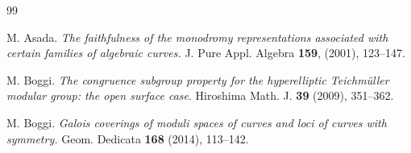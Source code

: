 \documentclass[12pt,twoside]{amsart}
\theoremstyle{definition}
\begin{document}


\begin{thebibliography}{99}





M. Asada. \textsl{The faithfulness of the monodromy representations associated
with certain families of algebraic curves.} J. Pure Appl. Algebra {\bf 159}, (2001), 123--147. 





 M. Boggi. \textsl{The congruence subgroup property for the hyperelliptic 
Teichm\"uller modular group: the open surface case}. Hiroshima Math. J. {\bf 39} (2009), 351--362.  


 M. Boggi. \textsl{Galois coverings of moduli spaces of curves and loci of curves with symmetry.} 
Geom. Dedicata {\bf 168} (2014), 113--142. 


\end{thebibliography}
\end{document}
